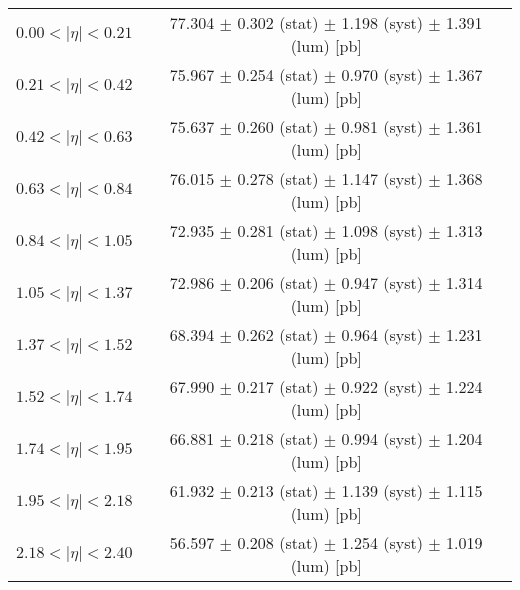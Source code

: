 \begin{tabular}{lc}
\hline
$0.00 < |\eta| <0.21$          & 77.304 $\pm$ 0.302 (stat) $\pm$ 1.198 (syst) $\pm$ 1.391 (lum) [pb]  \\
$0.21 < |\eta| <0.42$          & 75.967 $\pm$ 0.254 (stat) $\pm$ 0.970 (syst) $\pm$ 1.367 (lum) [pb]  \\
$0.42 < |\eta| <0.63$          & 75.637 $\pm$ 0.260 (stat) $\pm$ 0.981 (syst) $\pm$ 1.361 (lum) [pb]  \\
$0.63 < |\eta| <0.84$          & 76.015 $\pm$ 0.278 (stat) $\pm$ 1.147 (syst) $\pm$ 1.368 (lum) [pb]  \\
$0.84 < |\eta| <1.05$          & 72.935 $\pm$ 0.281 (stat) $\pm$ 1.098 (syst) $\pm$ 1.313 (lum) [pb]  \\
$1.05 < |\eta| <1.37$          & 72.986 $\pm$ 0.206 (stat) $\pm$ 0.947 (syst) $\pm$ 1.314 (lum) [pb]  \\
$1.37 < |\eta| <1.52$          & 68.394 $\pm$ 0.262 (stat) $\pm$ 0.964 (syst) $\pm$ 1.231 (lum) [pb]  \\
$1.52 < |\eta| <1.74$          & 67.990 $\pm$ 0.217 (stat) $\pm$ 0.922 (syst) $\pm$ 1.224 (lum) [pb]  \\
$1.74 < |\eta| <1.95$          & 66.881 $\pm$ 0.218 (stat) $\pm$ 0.994 (syst) $\pm$ 1.204 (lum) [pb]  \\
$1.95 < |\eta| <2.18$          & 61.932 $\pm$ 0.213 (stat) $\pm$ 1.139 (syst) $\pm$ 1.115 (lum) [pb]  \\
$2.18 < |\eta| <2.40$          & 56.597 $\pm$ 0.208 (stat) $\pm$ 1.254 (syst) $\pm$ 1.019 (lum) [pb]  \\
\hline
\end{tabular}
